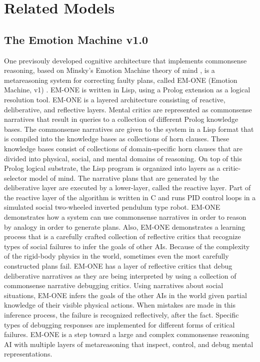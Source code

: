 \chapter{Related Models}
\label{chapter:related_models}

\section{The Emotion Machine v1.0}

One previsouly developed cognitive architecture that implements
commonsense reasoning, based on Minsky's Emotion Machine theory of
mind \cite[]{minsky:2006}, is a metareasoning system for correcting
faulty plans, called EM-ONE (Emotion Machine, v1)
\cite[]{singh:2005b}. EM-ONE is written in Lisp, using a Prolog
extension as a logical resolution tool. EM-ONE is a layered
architecture consisting of reactive, deliberative, and reflective
layers. Mental critics are represented as commonsense narratives that
result in queries to a collection of different Prolog knowledge
bases. The commonsense narratives are given to the system in a Lisp
format that is compiled into the knowledge bases as collections of
horn clauses. These knowledge bases consist of collections of
domain-specific horn clauses that are divided into physical, social,
and mental domains of reasoning. On top of this Prolog logical
substrate, the Lisp program is organized into layers as a
critic-selector model of mind. The narrative plans that are generated
by the deliberative layer are executed by a lower-layer, called the
reactive layer. Part of the reactive layer of the algorithm is written
in C and runs PID control loops in a simulated social two-wheeled
inverted pendulum type robot. EM-ONE demonstrates how a system can use
commonsense narratives in order to reason by analogy in order to
generate plans. Also, EM-ONE demonstrates a learning process that is a
carefully crafted collection of reflective critics that recognize
types of social failures to infer the goals of other AIs.  Because of
the complexity of the rigid-body physics in the world, sometimes even
the most carefully constructed plans fail. EM-ONE has a layer of
reflective critics that debug deliberative narratives as they are
being interpreted by using a collection of commonsense narrative
debugging critics.  Using narratives about social situations, EM-ONE
infers the goals of the other AIs in the world given partial knowledge
of their visible physical actions. When mistakes are made in this
inference process, the failure is recognized reflectively, after the
fact. Specific types of debugging responses are implemented for
different forms of critical failures. EM-ONE is a step toward a large
and complex commonsense reasoning AI with multiple layers of
metareasoning that inspect, control, and debug mental representations.

